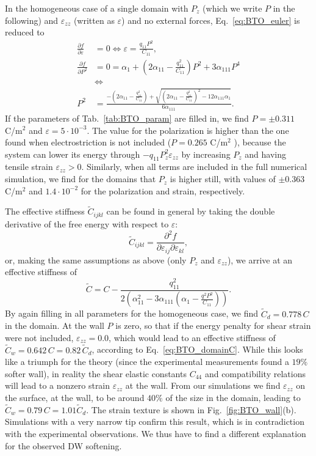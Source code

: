 In the homogeneous case of a single domain with $P_z$ (which we write $P$ in the following) and $\varepsilon_{zz}$ (written as $\varepsilon$) and no external forces, Eq.~\ref{eq:BTO_euler} is reduced to  
\begin{align}
	\frac{\partial f}{\partial \varepsilon} &= 0 \Leftrightarrow \varepsilon = \frac{q_{11}P^2}{C_{11}}\label{eq:BTO_e0},\\
	\frac{\partial f}{\partial P^2} &= 0 = \alpha_1 + (2 \alpha_{11} - \frac{q_{11}^2}{C_{11}})P^2 + 3\alpha_{111}P^4 \\
	& \Leftrightarrow \\
	P^2 &= \frac{-(2\alpha_{11} - \frac{q_{11}^2}{C_{11}}) + \sqrt{(2\alpha_{11}-\frac{q_{11}^2}{C_{11}})^2 - 12 \alpha_{111} \alpha_1}}{6\alpha_{111}}.
\end{align}
If the parameters of Tab.~\ref{tab:BTO_param} are filled in, we find $P = \pm 0.311$ C/m$^2$ and $\varepsilon = 5 \cdot 10^{-3}$.
The value for the polarization is higher than the one found when electrostriction is not included ($P = 0.265$ C/m$^2$ \cite{Marton2010}), because the system can lower its energy through $-q_{11}P_z^2\varepsilon_{zz}$ by increasing $P_z$ and having tensile strain $\varepsilon_{zz} > 0$.
Similarly, when all terms are included in the full numerical simulation, we find for the domains that $P_z$ is higher still, with values of $\pm 0.363$ C/m$^2$ and $1.4 \cdot 10^{-2}$ for the polarization and strain, respectively.

The effective stiffness $\tilde{C}_{ijkl}$ can be found in general by taking the double derivative of the free energy with respect to $\varepsilon$:
\begin{equation}
	\tilde{C}_{ijkl} = \frac{\partial^2 f}{\partial \varepsilon_{ij} \partial \varepsilon_{kl}},
\end{equation}
or, making the same assumptions as above (only $P_z$ and $\varepsilon_{zz}$), we arrive at an effective stiffness of
\begin{equation}
	\tilde{C} = C - \frac{q_{11}^2}{2\left(\alpha_{11}^2 - 3 \alpha_{111}\left(\alpha_1  - \frac{q^2 P^2}{C_{11}}\right)\right)}\label{eq:BTO_domainC}.
\end{equation}
By again filling in all parameters for the homogeneous case, we find $\tilde{C}_d = 0.778 \,C$ in the domain.
At the wall $P$ is zero, so that if the energy penalty for shear strain were not included, $\varepsilon_{zz} = 0.0$, which would lead to an effective stiffness of $\tilde{C}_w = 0.642 \, C = 0.82\, \tilde{C}_d$, according to Eq.~\ref{eq:BTO_domainC}.
While this looks like a triumph for the theory (since the experimental measurements found a $19\%$ softer wall), in reality the shear elastic constants $C_{44}$ and compatibility relations will lead to a nonzero strain $\varepsilon_{zz}$ at the wall.
From our simulations we find $\varepsilon_{zz}$ on the surface, at the wall, to be around $40\%$ of the size in the domain, leading to $\tilde{C}_w = 0.79 \, C = 1.01 \tilde{C}_d$.
The strain texture is shown in Fig.~\ref{fig:BTO_wall}(b).
Simulations with a very narrow tip confirm this result, which is in contradiction with the experimental observations.
We thus have to find a different explanation for the observed DW softening.

